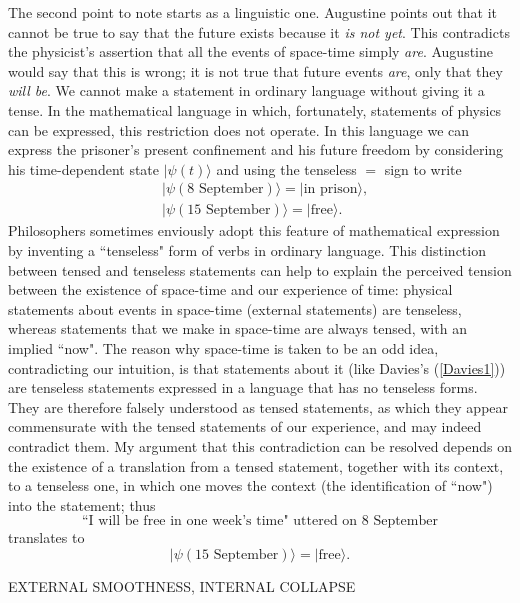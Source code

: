 \documentclass[12pt,a4paper,reqno]{article}
\renewcommand{\(}{\left(}
\renewcommand{\)}{\right)}
\newcommand{\<}{\langle}
\renewcommand{\>}{\rangle}
\theoremstyle{plain} %
\theoremstyle{definition}
\theoremstyle{remark}
\begin{document}
The second point to note starts as a linguistic one. Augustine points
out that it cannot be true to say that the future exists because it
\emph{is not yet}. This contradicts the physicist's assertion that all
the events of space-time simply \emph{are}. Augustine would say that
this is wrong; it is not true that future events \emph{are}, only that
they \emph{will be}. We cannot make a statement in ordinary language
without giving it a tense. In the mathematical language in which,
fortunately, statements of physics can be expressed, this restriction
does not operate. In this language we can express the prisoner's present
confinement and his future freedom by considering his time-dependent
state $|\psi(t)\>$ and using the tenseless $=$ sign to write
\begin{align*}
&|\psi(\text{8 September})\> = |\text{in prison}\>,\\
&|\psi(\text{15 September})\> = |\text{free}\>.
\end{align*}
Philosophers sometimes enviously adopt this feature of mathematical expression
by inventing a ``tenseless" form of verbs in ordinary language. This
distinction between tensed and tenseless statements can help to explain
the perceived tension between the existence of space-time and our
experience of time: physical statements about events in space-time
(external statements) are tenseless, whereas statements that we make in
space-time are always tensed, with an implied ``now". The reason
why space-time is taken to be an odd idea, contradicting our intuition,
is that statements about it (like Davies's (\ref{Davies1})) are
tenseless statements expressed in a language that has no tenseless
forms. They are therefore falsely understood as tensed statements, as which they
appear commensurate with the tensed statements of our experience, and
may indeed contradict them. My argument that
this contradiction can be resolved depends on the existence of a translation
from a tensed statement, together with its context, to a tenseless
one, in which one moves the context (the identification of ``now") into
the statement; thus 
\[
\text{``I will be free in one week's time" uttered on 8 September}
\]
translates to 
\[
|\psi(\text{15 September})\> = |\text{free}\>.
\]

\medskip
\begin{center}
EXTERNAL SMOOTHNESS, INTERNAL COLLAPSE
\end{center}
\end{document}
